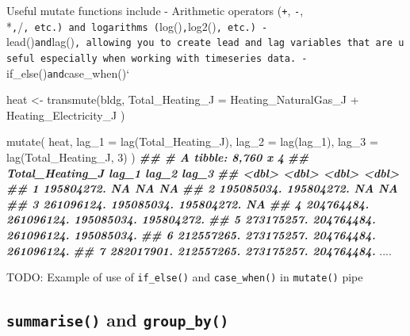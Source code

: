 \documentclass[
]{book}
\newenvironment{Shaded}{\begin{snugshade}}{\end{snugshade}}
\newcommand{\AttributeTok}[1]{\textcolor[rgb]{0.77,0.63,0.00}{#1}}
\newcommand{\DecValTok}[1]{\textcolor[rgb]{0.00,0.00,0.81}{#1}}
\newcommand{\DocumentationTok}[1]{\textcolor[rgb]{0.56,0.35,0.01}{\textbf{\textit{#1}}}}
\newcommand{\FunctionTok}[1]{\textcolor[rgb]{0.00,0.00,0.00}{#1}}
\newcommand{\NormalTok}[1]{#1}
\newcommand{\OtherTok}[1]{\textcolor[rgb]{0.56,0.35,0.01}{#1}}
\newcommand{\SpecialCharTok}[1]{\textcolor[rgb]{0.00,0.00,0.00}{#1}}
\begin{document}
Useful mutate functions include
- Arithmetic operators (\texttt{+}, \texttt{-}, *\texttt{,}/\texttt{,\ etc.)\ and\ logarithms\ (}log()\texttt{,}log2()\texttt{,\ etc.)\ -}lead()\texttt{and}lag()\texttt{,\ allowing\ you\ to\ create\ lead\ and\ lag\ variables\ that\ are\ useful\ especially\ when\ working\ with\ timeseries\ data.\ -}if\_else()\texttt{and}case\_when()`

\begin{Shaded}
\begin{Highlighting}[]
\NormalTok{heat }\OtherTok{\textless{}{-}} \FunctionTok{transmute}\NormalTok{(bldg,}
  \AttributeTok{Total\_Heating\_J =}\NormalTok{ Heating\_NaturalGas\_J }\SpecialCharTok{+}\NormalTok{ Heating\_Electricity\_J}
\NormalTok{)}

\FunctionTok{mutate}\NormalTok{(}
\NormalTok{  heat,}
  \AttributeTok{lag\_1 =} \FunctionTok{lag}\NormalTok{(Total\_Heating\_J),}
  \AttributeTok{lag\_2 =} \FunctionTok{lag}\NormalTok{(lag\_1),}
  \AttributeTok{lag\_3 =} \FunctionTok{lag}\NormalTok{(Total\_Heating\_J, }\DecValTok{3}\NormalTok{)}
\NormalTok{)}
\DocumentationTok{\#\# \# A tibble: 8,760 x 4}
\DocumentationTok{\#\#    Total\_Heating\_J      lag\_1      lag\_2      lag\_3}
\DocumentationTok{\#\#              \textless{}dbl\textgreater{}      \textless{}dbl\textgreater{}      \textless{}dbl\textgreater{}      \textless{}dbl\textgreater{}}
\DocumentationTok{\#\#  1      195804272.        NA         NA         NA }
\DocumentationTok{\#\#  2      195085034. 195804272.        NA         NA }
\DocumentationTok{\#\#  3      261096124. 195085034. 195804272.        NA }
\DocumentationTok{\#\#  4      204764484. 261096124. 195085034. 195804272.}
\DocumentationTok{\#\#  5      273175257. 204764484. 261096124. 195085034.}
\DocumentationTok{\#\#  6      212557265. 273175257. 204764484. 261096124.}
\DocumentationTok{\#\#  7      282017901. 212557265. 273175257. 204764484.}
\NormalTok{....}
\end{Highlighting}
\end{Shaded}

TODO: Example of use of \texttt{if\_else()} and \texttt{case\_when()} in \texttt{mutate()} pipe

\hypertarget{summarise-and-group_by}{%
\subsection{\texorpdfstring{\texttt{summarise()} and \texttt{group\_by()}}{summarise() and group\_by()}}\label{summarise-and-group_by}}
\end{document}
